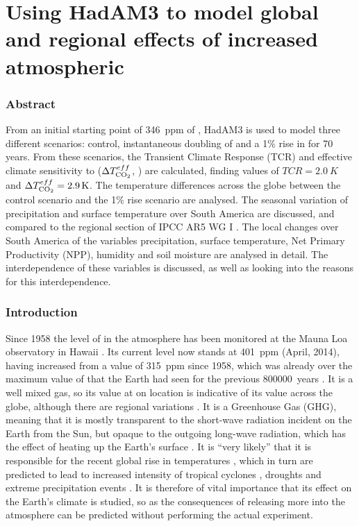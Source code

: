 \documentclass{article}
\begin{document}
\part*{Using HadAM3 to model global and regional effects of increased atmospheric }

\section*{Abstract}

From an initial starting point of \SI{346}{ppm} of , HadAM3 is used to model three different scenarios: control, instantaneous doubling of  and a 1\% rise in  for 70 years. From these scenarios, the Transient Climate Response (TCR) and effective climate sensitivity to  ($\Delta T^{eff}_{\ce{CO2}}$, ) are calculated, finding values of $TCR = \SI{2.0}{K}$ and $\Delta T^{eff}_{\ce{CO2}} = \SI{2.9}{K}$. The temperature differences across the globe between the control scenario and the 1\% rise scenario are analysed. The seasonal variation of precipitation and surface temperature over South America are discussed, and compared to the regional section of IPCC AR5 WG I \parencite{ipcc2014wg1}. The local changes over South America of the variables precipitation, surface temperature, Net Primary Productivity (NPP), humidity and soil moisture are analysed in detail. The interdependence of these variables is discussed, as well as looking into the reasons for this interdependence.

\section{Introduction}

Since 1958 the level of  in the atmosphere has been monitored at the Mauna Loa observatory in Hawaii \parencite{keeling1976atmospheric}. Its current level now stands at \SI{401}{ppm} (April, 2014), having increased from a value of \SI{315}{ppm} since 1958, which was already over the maximum value of  that the Earth had seen for the previous \SI{800 000}{years} \parencite{yin2012individual}. It is a well mixed gas, so its value at on location is indicative of its value across the globe, although there are regional variations \parencite{gurney2002towards}. It is a Greenhouse Gas (GHG), meaning that it is mostly transparent to the short-wave radiation incident on the Earth from the Sun, but opaque to the outgoing long-wave radiation, which has the effect of heating up the Earth's surface \parencite{neelin2011climate}. It is ``very likely'' that it is responsible for the recent global rise in temperatures \parencite{ipcc2014wg1}, which in turn are predicted to lead to increased intensity of tropical cyclones \parencite{knutson2010tropical}, droughts \parencite{dai2012increasing} and extreme precipitation events \parencite{shongwe2009projected}. It is therefore of vital importance that its effect on the Earth's climate is studied, so as the consequences of releasing more  into the atmosphere can be predicted without performing the actual experiment.
\end{document}
